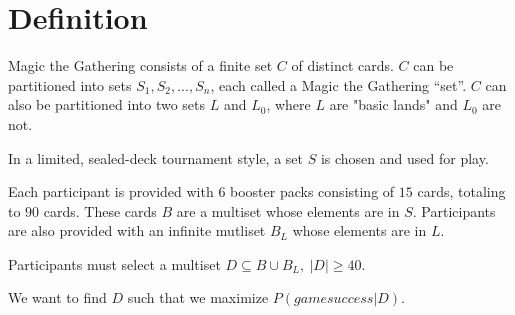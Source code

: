 \documentclass[12pt,letterpaper]{report}
\begin{document}
\section{Definition}

Magic the Gathering consists of a finite set $ C $ of distinct cards.
$ C $ can be partitioned into sets $ S_1, S_2, ..., S_n $, each called a Magic the Gathering \enquote{set}.
$ C $ can also be partitioned into two sets $ L $ and $ L_0 $, where $ L $ are "basic lands" and $ L_0 $ are not.

In a limited, sealed-deck tournament style,
a set $ S $ is chosen and used for play.

Each participant is provided with 6 booster packs consisting of $ 15 $ cards, totaling to $ 90 $ cards.
These cards $ B $ are a multiset whose elements are in $ S $.
Participants are also provided with an infinite mutliset $ B_L $ whose elements are in $ L $.

Participants must select a multiset $ D \subseteq B \cup B_L , \ |D| \ge 40 $.

We want to find $ D $ such that we maximize $ P(game success | D) $.
\end{document}
